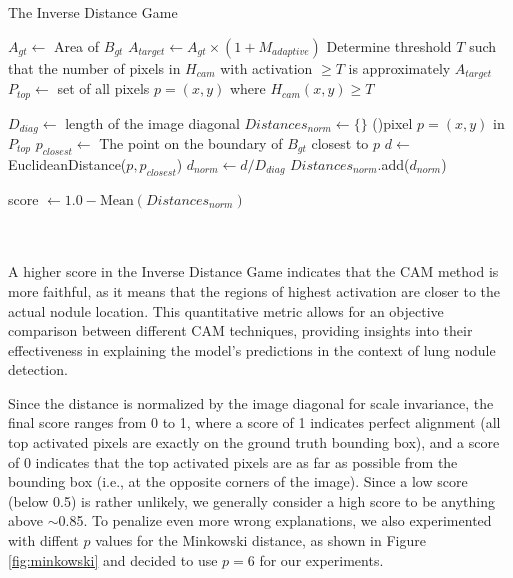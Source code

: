 \begin{algorithm}[H]
    \caption{The Inverse Distance Game}
    \label{alg:distance-game}
    \DontPrintSemicolon
    \SetAlgoLined

    
    \BlankLine
    
    $A_{gt} \gets$ Area of $B_{gt}$\;
    $A_{target} \gets A_{gt} \times (1 + M_{adaptive})$\;
    Determine threshold $T$ such that the number of pixels in $H_{cam}$ with activation $\ge T$ is approximately $A_{target}$\;
    $P_{top} \gets$ set of all pixels $p=(x, y)$ where $H_{cam}(x, y) \ge T$\;

    \BlankLine

    $D_{diag} \gets$ length of the image diagonal\;
    $Distances_{norm} \gets \{\}$\;
    \ForAll(){pixel $p=(x, y)$ \textup{in} $P_{top}$}{
        $p_{closest} \gets$ The point on the boundary of $B_{gt}$ closest to $p$\;
        $d \gets$ EuclideanDistance($p, p_{closest}$)\;
        $d_{norm} \gets d / D_{diag}$\;
        $Distances_{norm}$.add($d_{norm}$)\;
    }

    \BlankLine
    score $\gets 1.0 - \text{Mean}(Distances_{norm})$\;
    \;
\end{algorithm}
\,\\\,\\
A higher score in the Inverse Distance Game indicates that the CAM method is more faithful, as it means that the regions of highest activation are closer to the actual nodule location. This quantitative metric allows for an objective comparison between different CAM techniques, providing insights into their effectiveness in explaining the model's predictions in the context of lung nodule detection.

Since the distance is normalized by the image diagonal for scale invariance, the final score ranges from 0 to 1, where a score of 1 indicates perfect alignment (all top activated pixels are exactly on the ground truth bounding box), and a score of 0 indicates that the top activated pixels are as far as possible from the bounding box (i.e., at the opposite corners of the image).
Since a low score (below 0.5) is rather unlikely, we generally consider a high score to be anything above $\sim$0.85. To penalize even more wrong explanations, we also experimented with diffent $p$ values for the Minkowski distance, as shown in Figure \ref{fig:minkowski} and decided to use $p=6$ for our experiments.





